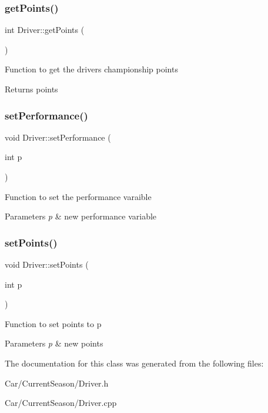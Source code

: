 \subsubsection{\texorpdfstring{get\+Points()}{getPoints()}}
{\footnotesize\ttfamily int Driver\+::get\+Points (\begin{DoxyParamCaption}{ }\end{DoxyParamCaption})}

Function to get the drivers championship points \begin{DoxyReturn}{Returns}
points 
\end{DoxyReturn}
\mbox{\label{classDriver_aa8e4524d765561c16d2bf6072e963e83}} 
\subsubsection{\texorpdfstring{set\+Performance()}{setPerformance()}}
{\footnotesize\ttfamily void Driver\+::set\+Performance (\begin{DoxyParamCaption}\item[{int}]{p }\end{DoxyParamCaption})}

Function to set the performance varaible 
\begin{DoxyParams}{Parameters}
{\em p} & new performance variable \\
\hline
\end{DoxyParams}
\mbox{\label{classDriver_a10b1b27d8d99ed19304b69727f0a0504}} 
\subsubsection{\texorpdfstring{set\+Points()}{setPoints()}}
{\footnotesize\ttfamily void Driver\+::set\+Points (\begin{DoxyParamCaption}\item[{int}]{p }\end{DoxyParamCaption})}

Function to set points to p 
\begin{DoxyParams}{Parameters}
{\em p} & new points \\
\hline
\end{DoxyParams}


The documentation for this class was generated from the following files\+:\begin{DoxyCompactItemize}
\item 
Car/\+Current\+Season/Driver.\+h\item 
Car/\+Current\+Season/Driver.\+cpp\end{DoxyCompactItemize}
